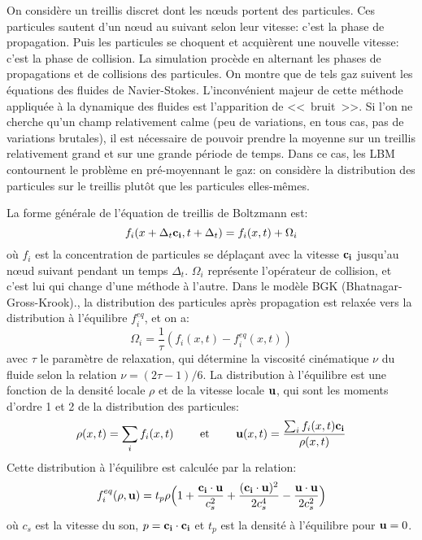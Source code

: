 On considère un treillis discret dont les nœuds portent des particules. Ces particules sautent d'un nœud au suivant selon leur vitesse: c'est la phase de propagation. Puis les particules se choquent et acquièrent une nouvelle vitesse: c'est la phase de collision. La simulation procède en alternant les phases de propagations et de collisions des particules. On montre que de tels gaz suivent les équations des fluides de Navier-Stokes. L'inconvénient majeur de cette méthode appliquée à la dynamique des fluides est l'apparition de <<~bruit~>>. Si l'on ne cherche qu'un champ relativement calme (peu de variations, en tous cas, pas de variations brutales), il est nécessaire de pouvoir prendre la moyenne sur un treillis relativement grand et sur une grande période de temps. Dans ce cas, les LBM contournent le problème en pré-moyennant le gaz: on considère la distribution des particules sur le treillis plutôt que les particules elles-mêmes.

\medskip
La forme générale de l'équation de treillis de Boltzmann est:
\begin{equation}
f_i(x+\Delta_t \mathbf{c_i}, t+\Delta_t) = f_i(x,t) + \Omega_i
\end{equation}
où $f_i$ est la concentration de particules se déplaçant avec la vitesse $\mathbf{c_i}$ jusqu'au nœud suivant pendant un temps $\Delta_t$. $\Omega_i$ représente l'opérateur de collision, et c'est lui qui change d'une méthode à l'autre. Dans le modèle BGK (Bhatnagar-Gross-Krook)., la distribution des particules après propagation est relaxée vers la distribution à l'équilibre $f_i^{eq}$, et on a:
\begin{equation}
\Omega_i = \frac1{\tau}\left(f_i(x,t)-f_i^{eq}(x,t)\right)
\end{equation}
avec $\tau$ le paramètre de relaxation, qui détermine la viscosité cinématique $\nu$ du fluide selon la relation $\nu=(2\tau -1)/6$. La distribution à l'équilibre est une fonction de la densité locale $\rho$ et de la vitesse locale $\mathbf{u}$, qui sont les moments d'ordre 1 et 2 de la distribution des particules:
\begin{equation}
\rho(x,t) = \displaystyle\sum_i f_i(x,t) \qquad\text{ et }\qquad \mathbf{u}(x,t)=\dfrac{\sum_i f_i(x,t)\mathbf{c_i}}{\rho(x,t)}
\end{equation}
Cette distribution à l'équilibre est calculée par la relation:
\begin{equation}
f_i^{eq}(\rho,\mathbf{u}) = t_p \rho \Bigl(1+\dfrac{\mathbf{c_i}\cdot\mathbf{u}}{c_s^2} + \dfrac{(\mathbf{c_i}\cdot\mathbf{u})^2}{2c_s^4} - \dfrac{\mathbf{u}\cdot\mathbf{u}}{2c_s^2}\Bigr)
\end{equation}
où $c_s$ est la vitesse du son, $p=\mathbf{c_i}\cdot\mathbf{c_i}$ et $t_p$ est la densité à l'équilibre pour $\mathbf{u}=0$.






